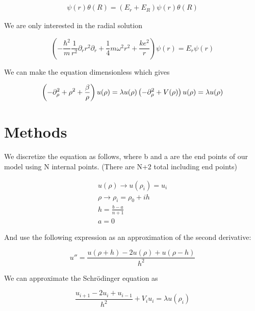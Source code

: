 \documentclass[twocolumn, groupedaddress]{revtex4-1}
\begin{document}
\begin{align}
  [ \left( - \frac{\hbar^2}{m} \frac{1}{r^2} \partial_r r^2 \partial_r + \frac{1}{4} m \omega^2 r^2 + \frac{k e^2}{r} \right) 	\nonumber \\
+ \left( - \frac{\hbar^2}{4m} \frac{1}{R^2} \partial_R R^2 \partial_R + m\omega^2 R^2 + \frac{\hbar l(l+1)}{R^2} \right) ]		\nonumber \\
 \psi (r) \theta (R) = (E_r + E_R) \psi (r) \theta (R)
\end{align}

We are only interested in the radial solution

\begin{equation}
\left( - \frac{\hbar^2}{m} \frac{1}{r^2} \partial_r r^2 \partial_r + \frac{1}{4} m \omega^2 r^2 + \frac{k e^2}{r} \right) \psi (r)  = E_r \psi (r)
\end{equation}

We can make the equation dimensionless which gives

\begin{equation}
\left( - \partial_\rho^2 + \rho^2 + \frac{\beta}{\rho} \right) u ( \rho ) = \lambda u(\rho ) \\
\left( - \partial_\rho^2 + V (\rho ) \right) u ( \rho ) = \lambda u(\rho )
\end{equation}

\section{Methods}

We discretize the equation as follows, where b and a are the end points of our model using N internal points. (There are N+2 total including end points)

\begin{equation}
\begin{aligned}
u(\rho) \to u(\rho_i) = u_i \\
\rho \to \rho_i = \rho_0 + i h \\
h = \frac{b-a}{n+1} \\
a = 0
\end{aligned}
\end{equation}

And use the following expression as an approximation of the second derivative:

$$u''=\frac{u(\rho+h)-2u(\rho)+u(\rho-h)}{h^2}$$

We can approximate the Schr\"odinger equation as 

$$\frac{u_{i+1}-2u_i+u_{i-1}}{h^2}+V_iu_i=\lambda u(\rho_i)$$
\end{document}
